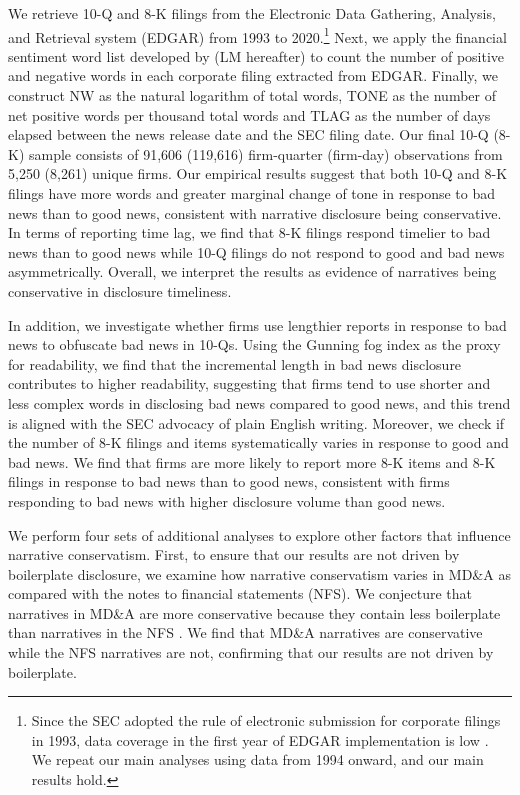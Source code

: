 \documentclass[letterpaper,11pt]{article}
\begin{document}
\begin{spacing}{1.5}
We retrieve 10-Q and 8-K filings from the Electronic Data Gathering, Analysis, and Retrieval system (EDGAR) from 1993 to 2020.\footnote{Since the SEC adopted the rule of electronic submission for corporate filings in 1993, data coverage in the first year of EDGAR implementation is low \cite{gaoInformingMarketEffect2020}. We repeat our main analyses using data from 1994 onward, and our main results hold.} Next, we apply the financial sentiment word list developed by  (LM hereafter) to count the number of positive and negative words in each corporate filing extracted from EDGAR. Finally, we construct NW as the natural logarithm of total words, TONE as the number of net positive words per thousand total words and TLAG as the number of days elapsed between the news release date and the SEC filing date. Our final 10-Q (8-K) sample consists of 91,606 (119,616) firm-quarter (firm-day) observations from 5,250 (8,261) unique firms. Our empirical results suggest that both 10-Q and 8-K filings have more words and greater marginal change of tone in response to bad news than to good news, consistent with narrative disclosure being conservative. In terms of reporting time lag, we find that 8-K filings respond timelier to bad news than to good news while 10-Q filings do not respond to good and bad news asymmetrically. Overall, we interpret the results as evidence of narratives being conservative in disclosure timeliness.

In addition, we investigate whether firms use lengthier reports in response to bad news to obfuscate bad news in 10-Qs. Using the Gunning fog index as the proxy for readability, we find that the incremental length in bad news disclosure contributes to higher readability, suggesting that firms tend to use shorter and less complex words in disclosing bad news compared to good news, and this trend is aligned with the SEC advocacy of plain English writing. Moreover, we check if the number of 8-K filings and items systematically varies in response to good and bad news. We find that firms are more likely to report more 8-K items and 8-K filings in response to bad news than to good news, consistent with firms responding to bad news with higher disclosure volume than good news.

We perform four sets of additional analyses to explore other factors that influence narrative conservatism. First, to ensure that our results are not driven by boilerplate disclosure, we examine how narrative conservatism varies in MD\&A as compared with the notes to financial statements (NFS). We conjecture that narratives in MD\&A are more conservative because they contain less boilerplate than narratives in the NFS \cite{secFinancialReportingManual2019}. We find that MD\&A narratives are conservative while the NFS narratives are not, confirming that our results are not driven by boilerplate. 


\end{spacing}
\end{document}
